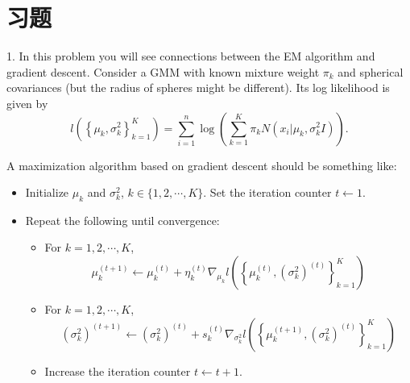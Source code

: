 \documentclass[openany]{ctexbook}
\theoremstyle{kaiti}
\theoremstyle{normal}
\begin{document}
\section{习题}


1. In this problem you will see connections between the EM algorithm and gradient descent. Consider a GMM with known mixture weight $\pi_k$ and spherical covariances (but the radius of spheres might be different). Its log likelihood is given by
\begin{equation}
	l\left(\left\{\mu_k,\sigma_k^2\right\}_{k=1}^K\right) = \sum_{i=1}^n\log\left(\sum_{k=1}^K\pi_k N(x_i|\mu_k,\sigma_k^2I)\right).
\end{equation}

A maximization algorithm based on gradient descent should be something like:
\begin{itemize}
	\item Initialize $\mu_k$ and $\sigma_k^2$, $k \in\{1,2,\cdots,K\}$. Set the iteration counter $t\leftarrow1$.
	\item Repeat the following until convergence:
	\begin{itemize}
		\item For $k=1,2,\cdots ,K$,
      \begin{equation}
        \mu_k^{(t+1)}\leftarrow\mu_k^{(t)}+\eta_k^{(t)}\nabla_{\mu_k}l\left(\left\{\mu_k^{(t)},(\sigma_k ^2)^{(t)}\right\}_{k=1}^K\right)
      \end{equation}
		\item For $k=1,2,\cdots ,K$,
      \begin{equation}
        (\sigma_k ^2)^{(t+1)} \leftarrow (\sigma_k ^2)^{(t)}+s_k^{(t)}\nabla_{\sigma_k^2}l\left(\left\{\mu_k^{(t+1)},(\sigma_k ^2)^{(t)}\right\}_{k=1}^K\right)
      \end{equation}
		\item Increase the iteration counter $t\leftarrow t+1$.
	\end{itemize}
\end{itemize}
\end{document}
